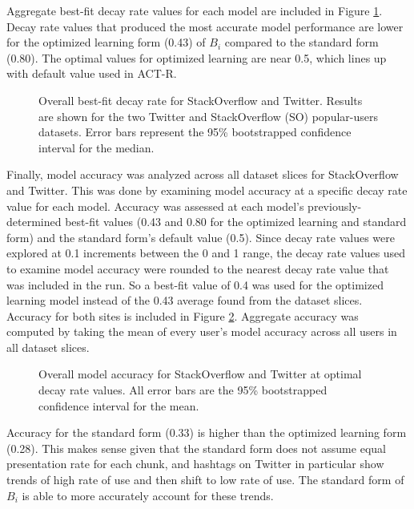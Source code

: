 \documentclass[man,donotrepeattitle]{apa6}
\newcommand{\numNoZero}[1]{{\sisetup{add-integer-zero=false}\num{#1}}}
\begin{document}
Aggregate best-fit decay rate values for each model are included in Figure \ref{figPriorDecay}.
Decay rate values that produced the most accurate model performance are lower for the optimized learning form (\num{.43}) of $B_{i}$ compared to the standard form (\num{.80}).
The optimal values for optimized learning are near \num{0.5}, which lines up with default value used in ACT-R.

\begin{figure}[!htbp]
  \caption{
  Overall best-fit decay rate for StackOverflow and Twitter.
  Results are shown for the two Twitter and StackOverflow (SO) popular-users datasets.
  Error bars represent the 95\% bootstrapped confidence interval for the median.
}
  \label{figPriorDecay}
\end{figure}

\FloatBarrier

Finally, model accuracy was analyzed across all dataset slices for StackOverflow and Twitter.
This was done by examining model accuracy at a specific decay rate value for each model.
Accuracy was assessed at each model's previously-determined best-fit values (\num{.43} and \num{.80} for the optimized learning and standard form) and the standard form's default value (\num{0.5}).
Since decay rate values were explored at \num{0.1} increments between the 0 and 1 range, the decay rate values used to examine model accuracy were rounded to the nearest decay rate value that was included in the run.
So a best-fit value of \num{.4} was used for the optimized learning model instead of the \num{.43} average found from the dataset slices.
Accuracy for both sites is included in Figure \ref{figPriorAcc}. 
Aggregate accuracy was computed by taking the mean of every user's model accuracy across all users in all dataset slices.

\begin{figure}[!htbp]
  \caption{
    Overall model accuracy for StackOverflow and Twitter at optimal decay rate values.
    All error bars are the 95\% bootstrapped confidence interval for the mean. 
  }
  \label{figPriorAcc}
\end{figure}

Accuracy for the standard form (\numNoZero{.33}) is higher than the optimized learning form (\numNoZero{.28}).
This makes sense given that the standard form does not assume equal presentation rate for each chunk, and hashtags on Twitter in particular show trends of high rate of use and then shift to low rate of use. 
The standard form of $B_{i}$ is able to more accurately account for these trends.
\end{document}
